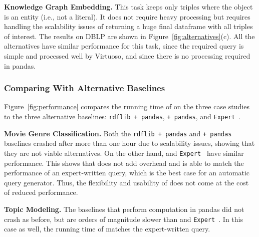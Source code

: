 \vspace{4pt}
\noindent
\textbf{Knowledge Graph Embedding.}
This task keeps only triples where the object is an entity (i.e., not a literal).
It does not require heavy processing but requires handling the scalability issues of returning a huge final dataframe with all triples of interest.
The results on DBLP are shown in Figure~\ref{fig:alternatives}(c).
All the alternatives have similar performance for this task, since the required \sparql query is simple and processed well by Virtuoso, and since there is no processing required in pandas.

\vspace*{-4pt}
\subsubsection{Comparing \rdfframes With Alternative Baselines}

\vspace*{-10pt}
Figure~\ref{fig:performance} compares the running time of \rdfframes on the three case studies
to the three alternative baselines:
\texttt{rdflib + pandas},
\texttt{\sparql + pandas},
and
\texttt{Expert \sparql}.

\vspace{4pt}
\noindent
\textbf{Movie Genre Classification.}
Both the \texttt{rdflib + pandas} and \texttt{\sparql + pandas}
baselines crashed after 
more than one hour
due to scalability issues, showing that they are not viable alternatives.
On the other hand, \rdfframes and \texttt{Expert \sparql} have similar performance.
This shows that \rdfframes does not add overhead and is able
to match the performance of an expert-written \sparql query,
which is the best case for an automatic query generator.
Thus, the flexibility and usability of \rdfframes does not come at the cost of reduced performance.

\vspace{4pt}
\noindent
\textbf{Topic Modeling.}
The baselines that perform computation in pandas did not crash as before, but are orders of magnitude slower than \rdfframes and \texttt{Expert \sparql}.
In this case as well, the running time of \rdfframes 
matches the expert-written \sparql query.

